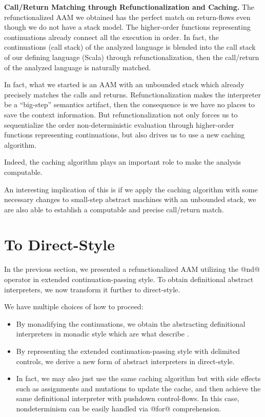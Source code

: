 \documentclass[acmsmall]{acmart}\settopmatter{}
\begin{document}
\textbf{Call/Return Matching through Refunctionalization and Caching.}
The refunctionalized AAM we obtained has the perfect match on return-flows even though 
we do not have a stack model. The higher-order functions representing continuations 
already connect all the execution in order. In fact, the continuations (call stack) 
of the analyzed language is blended into the call stack of our defining language 
(Scala) through refunctionalization, then the call/return of the analyzed language 
is naturally matched.

In fact, what we started is an AAM with an unbounded stack which already precisely 
matches the calls and returns.
Refunctionalization makes the interpreter be a ``big-step'' semantics artifact, 
then the consequence is we have no places to save the context information. 
But refunctionalization not only forces us to sequentialize the order non-deterministic 
evaluation through higher-order functions representing continuations, 
but also drives us to use a new caching algorithm.  

Indeed, the caching algorithm plays an important role to make the analysis computable. 

An interesting implication of this is if we apply the caching algorithm with some 
necessary changes to small-step abstract machines with an unbounded stack, 
we are also able to establish a computable and precise call/return match.

\section{To Direct-Style} \label{directstyle}

In the previous section, we presented a refunctionalized AAM utilizing the @nd@ operator
in extended continuation-passing style.
To obtain definitional abstract interpreters, we now transform it further to direct-style.

We have multiple choices of how to proceed:
\begin{itemize}
  \item By monadifying the continuations, we obtain the abstracting
    definitional interpreters in monadic style which are what \citeauthor{darais2017abstracting}
    describe \cite{darais2017abstracting}.
  \item By representing the extended continuation-passing style with delimited controls,
    we derive a new form of abstract interpreters in direct-style.
  \item In fact, we may also just use the same caching algorithm but with side effects such as
    assignments and mutations to update the cache, and then achieve the same definitional 
    interpreter with pushdown control-flows. In this case, nondeterminism can be easily 
    handled via @for@ comprehension.
\end{itemize}
\end{document}
